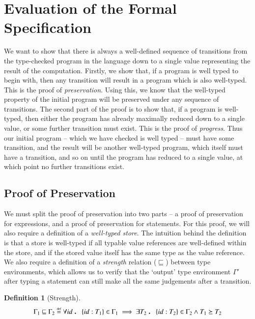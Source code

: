 \documentclass[12pt,a4paper,twoside,openright]{report}
\theoremstyle{definition}
\newtheorem{definition}{Definition}[section]
\theoremstyle{dotless}
\newcommand\eqdef{\mathrel{\overset{\makebox[0pt]{\mbox{\normalfont\tiny def}}}{=}}}
\newcommand\qdot{\mathbin{\scalebox{1.5}{.}}\enspace}
\begin{document}
\section{Evaluation of the Formal Specification}

We want to show that there is always a well-defined sequence of transitions
from the type-checked program in the language down to a single value
representing the result of the computation. Firstly, we show that, if a program
is well typed to begin with, then any transition will result in a program which
is also well-typed. This is the proof of \textit{preservation}.  Using this, we
know that the well-typed property of the initial program will be preserved
under any sequence of transitions. The second part of the proof is to show
that, if a program is well-typed, then either the program has already maximally
reduced down to a single value, or some further transition must exist. This is
the proof of \textit{progress}. Thus our initial program -- which we have
checked is well typed -- must have some transition, and the result will be
another well-typed program, which itself must have a transition, and so on
until the program has reduced to a single value, at which point no further
transitions exist.

\subsection{Proof of Preservation}

We must split the proof of preservation into two parts -- a proof of
preservation for expressions, and a proof of preservation for statements. For
this proof, we will also require a definition of a \textit{well-typed store}.
The intuition behind the definition is that a store is well-typed if all
typable value references are well-defined within the store, and if the stored
value itself has the same type as the value reference. We also require a
definition of a \textit{strength} relation ($\sqsubseteq$) between type environments, which
allows us to verify that the `output' type environment $\Gamma'$ after typing a
statement can still make all the same judgements after a transition.


\begin{definition}[Strength]
  \begin{equation} \label{eqn:strength}
	\Gamma_1 \sqsubseteq \Gamma_2 \eqdef 
	\forall id\qdot \{id:T_1\}\in\Gamma_1 \implies \exists T_2 \qdot \{id:T_2\}\in\Gamma_2 \land T_1\succeq T_2
  \end{equation}
\end{definition}
\end{document}
